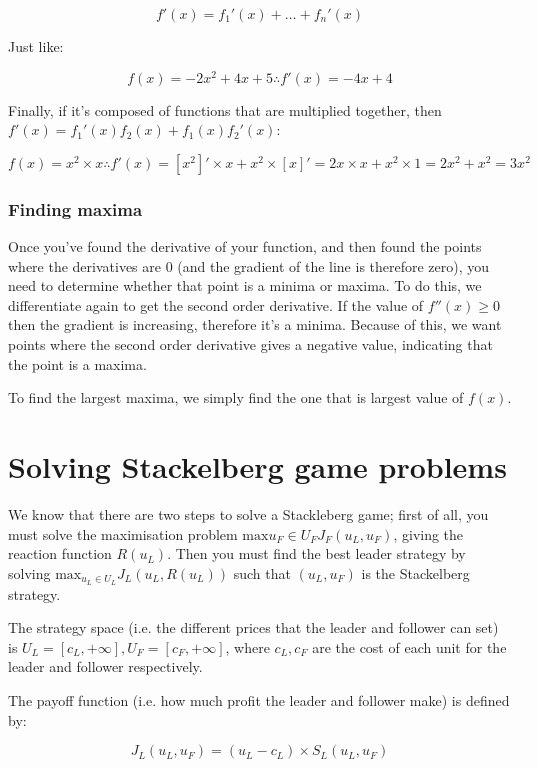 \[
  f'(x) = f_1'(x) + \dots + f_n'(x)
\]

Just like:

\[
  f(x) = -2x^2 + 4x + 5 \therefore f'(x) = -4x + 4
\]

Finally, if it's composed of functions that are multiplied together, then
$f'(x)= f_1'(x)f_2(x) + f_1(x)f_2'(x)$:

\[
  f(x) = x^2 \times x \therefore
    f'(x) = [x^2]' \times x + x^2 \times [x]' = 2x \times x + x^2 \times 1
          = 2x^2 + x^2 = 3x^2
\]

\subsubsection{Finding maxima}

Once you've found the derivative of your function, and then found the points
where the derivatives are 0 (and the gradient of the line is therefore zero),
you need to determine whether that point is a minima or maxima. To do this, we
differentiate again to get the second order derivative. If the value of $f''(x)
\geq 0$ then the gradient is increasing, therefore it's a minima. Because of
this, we want points where the second order derivative gives a negative value,
indicating that the point is a maxima.

To find the largest maxima, we simply find the one that is largest value of
$f(x)$.


\section{Solving Stackelberg game problems}

We know that there are two steps to solve a Stackleberg game; first of all, you
must solve the maximisation problem $\text{max}{u_F\in U_F}J_F(u_L,u_F)$, giving
the reaction function $R(u_L)$. Then you must find the best leader strategy by
solving $\text{max}_{u_L \in U_L} J_L(u_L, R(u_L))$ such that $(u_L, u_F)$ is
the Stackelberg strategy.

The strategy space (i.e. the different prices that the leader and follower can
set) is $U_L = [c_L, +\infty], U_F = [c_F, +\infty]$, where $c_L, c_F$ are the
cost of each unit for the leader and follower respectively.

The payoff function (i.e. how much profit the leader and follower make) is
defined by:

\[
  J_L(u_L, u_F) = (u_L - c_L) \times S_L(u_L, u_F)
\]

